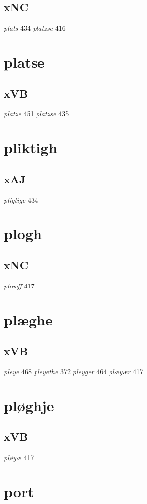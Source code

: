 \documentclass[a4paper,twocolumn]{article}
\begin{document}
\subsection{xNC}
\label{sec:org836c7e2}
\emph{plats} 434 \emph{platzse} 416 
\section{platse}
\label{sec:org9971692}
\subsection{xVB}
\label{sec:orgc900751}
\emph{platze} 451 \emph{platzse} 435 
\section{pliktigh}
\label{sec:orgbfbb091}
\subsection{xAJ}
\label{sec:org8d810fa}
\emph{pligtige} 434 
\section{plogh}
\label{sec:org50948de}
\subsection{xNC}
\label{sec:org16bd1b3}
\emph{plowff} 417 
\section{plæghe}
\label{sec:org9dd3034}
\subsection{xVB}
\label{sec:org9bce777}
\emph{pleye} 468 \emph{pleyethe} 372 \emph{pleyger} 464 \emph{plæyær} 417 
\section{pløghje}
\label{sec:orgb0e7a23}
\subsection{xVB}
\label{sec:orga7309d6}
\emph{pløyæ} 417 
\section{port}
\label{sec:org86bc1e5}
\end{document}
